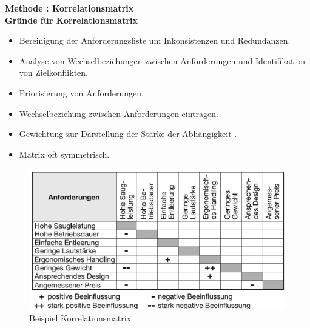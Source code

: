 \textbf{Methode : Korrelationsmatrix} \\

\textbf{Gründe für Korrelationsmatrix}
\begin{itemize}
    \item Bereinigung der Anforderungsliste um Inkonsistenzen und Redundanzen.
    \item Analyse von Wechselbeziehungen zwischen Anforderungen und Identifikation von Zielkonflikten.
    \item Priorisierung von Anforderungen.
\end{itemize}


\begin{itemize}
    \item Wechselbeziehung zwischen Anforderungen eintragen.
    \item Gewichtung zur Darstellung der Stärke der Abhängigkeit .
    \item Matrix oft symmetrisch.
\end{itemize}

\begin{figure}[H]
    \centering
    \includegraphics[width=0.7\linewidth]{Bilder/Teil2_Korrelationsmatrix_Beispiel.png}
    \caption{Beispiel Korrelationsmatrix}
\end{figure}